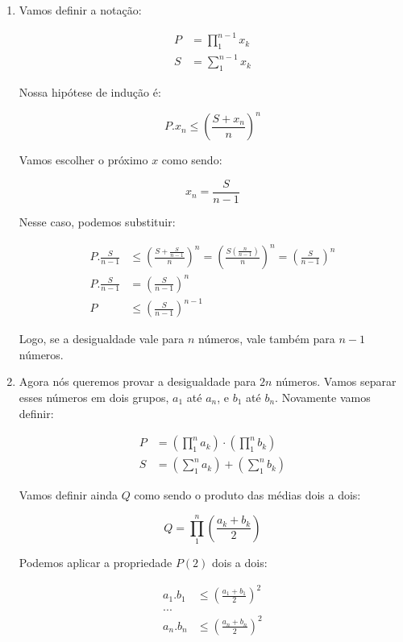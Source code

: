 \documentclass[10pt]{book}
\begin{document}
\begin{enumerate}
\item Vamos definir a notação:

\begin{align*}
 P&=\prod_1^{n-1}x_k \\
 S&=\sum_1^{n-1}x_k 
\end{align*}

Nossa hipótese de indução é: 

\[ P.x_n\leq(\frac{S+x_n}{n})^n \]

Vamos escolher o próximo $x$ como sendo: 

\[ x_n=\frac{S}{n-1} \]

Nesse caso, podemos substituir: 

\begin{align*}
 P.\frac{S}{n-1}&\leq\left( \frac{S+\frac{S}{n-1}}{n} \right)^n=\left( \frac{S\left(\frac{n}{n-1}  \right)}{n} \right)^n=\left( \frac{S}{n-1} \right)^n  \\
 P.\frac{S}{n-1}&=\left(\frac{S}{n-1}\right)^n \\
 P&\leq\left(\frac{S}{n-1}\right)^{n-1} 
\end{align*}

 Logo, se a desigualdade vale para $n$ números, vale também para $n-1$ números. 


\item Agora nós queremos provar a desigualdade para $2n$ números. Vamos separar esses números em dois grupos, $a_1$ até $a_n$, e $b_1$ até $b_n$. Novamente vamos definir: 

\begin{align*}
  P&=\left(\displaystyle\prod_1^{n}a_k\right)\cdot \left(\displaystyle\prod_1^{n}b_k\right) \\
  S&=\left(\displaystyle\sum_1^{n}a_k\right)+\left(\displaystyle\sum_1^{n}b_k\right) 
\end{align*}

Vamos definir ainda $Q$ como sendo o produto das médias dois a dois: 

\[ Q=\displaystyle\prod_{1}^{n}\left(\frac{a_k+b_k}{2}\right) \]

Podemos aplicar a propriedade $P(2)$ dois a dois: 

\begin{align*}
 a_1.b_1&\leq\left(\frac{a_1+b_1}{2}\right)^2 \\
 ... \\
 a_n.b_n&\leq\left(\frac{a_n+b_n}{2}\right)^2
\end{align*}


\end{enumerate}
\end{document}
